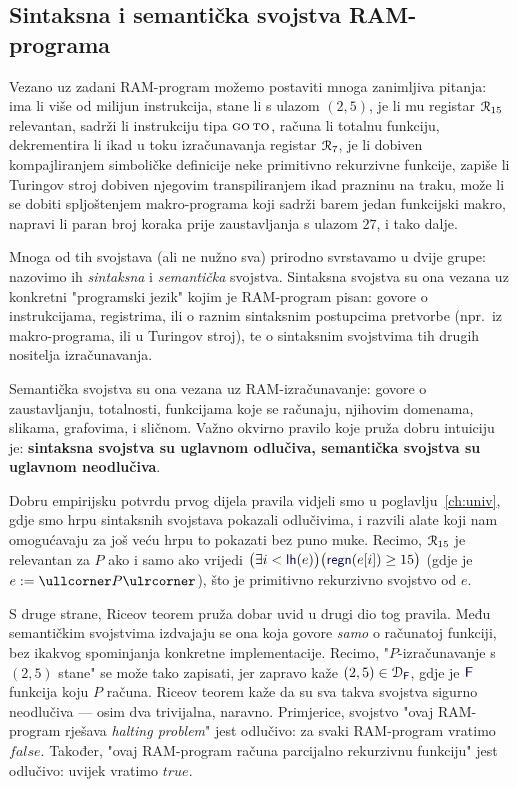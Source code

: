 \subsection{Sintaksna i semantička svojstva RAM-programa}

Vezano uz zadani RAM-program možemo postaviti mnoga zanimljiva pitanja: ima li više od milijun instrukcija, stane li s ulazom $(2,5)$, je li mu registar $\mathcal R_{15}$ relevantan, sadrži li instrukciju tipa $\textsc{go\,to}$, računa li totalnu funkciju, dekrementira li ikad u toku izračunavanja registar $\mathcal R_{7}$, je li dobiven kompajliranjem simboličke definicije neke primitivno rekurzivne funkcije, zapiše li Turingov stroj dobiven njegovim transpiliranjem ikad prazninu na traku, može li se dobiti spljoštenjem makro-programa koji sadrži barem jedan funkcijski makro, napravi li paran broj koraka prije zaustavljanja s ulazom $27$, i tako dalje.

Mnoga od tih svojstava (ali ne nužno sva) prirodno svrstavamo u dvije grupe: nazovimo ih \emph{sintaksna} i \emph{semantička} svojstva. Sintaksna svojstva su ona vezana uz konkretni "programski jezik" kojim je RAM-program pisan: govore o instrukcijama, registrima, ili o raznim sintaksnim postupcima pretvorbe (npr.\ iz makro-programa, ili u Turingov stroj), te o sintaksnim svojstvima tih drugih nositelja izračunavanja.

Semantička svojstva su ona vezana uz RAM-izračunavanje: govore o zaustavljanju, totalnosti, funkcijama koje se računaju, njihovim domenama, slikama, grafovima, i sličnom. Važno okvirno pravilo koje pruža dobru intuiciju je: \textbf{sintaksna svojstva su uglavnom odlučiva, semantička svojstva su uglavnom neodlučiva}.

Dobru empirijsku potvrdu prvog dijela pravila vidjeli smo u poglavlju~\ref{ch:univ}, gdje smo hrpu sintaksnih svojstava pokazali odlučivima, i razvili alate koji nam omogućavaju za još veću hrpu to pokazati bez puno muke. Recimo, $\mathcal R_{15}$ je relevantan za $P$ ako i samo ako vrijedi 
$\bigl(\exists i<\f{lh}(e)\bigr)\bigl(\f{regn}(e[i])\ge15\bigr)$ (gdje je $e:=\kprog P$), što je primitivno rekurzivno svojstvo od $e$.

S druge strane, Riceov teorem pruža dobar uvid u drugi dio tog pravila. Među semantičkim svojstvima izdvajaju se ona koja govore \emph{samo} o računatoj funkciji, bez ikakvog spominjanja konkretne implementacije. Recimo, "$P$-izračunavanje s $(2,5)$ stane" se može tako zapisati, jer zapravo kaže $(2,5)\in\dom{\f F}$, gdje je $\f F$ funkcija koju $P$ računa. Riceov teorem kaže da su sva takva svojstva sigurno neodlučiva --- osim dva trivijalna, naravno. Primjerice, svojstvo "ovaj RAM-program rješava \emph{halting problem}" jest odlučivo: za svaki RAM-program vratimo $\mathit{false}$. Također, "ovaj RAM-program računa parcijalno rekurzivnu funkciju" jest odlučivo: uvijek vratimo $\mathit{true}$.

